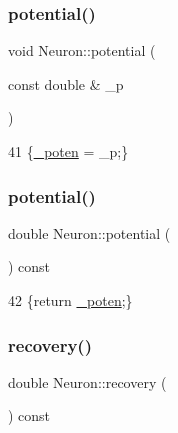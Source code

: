 \subsubsection{\texorpdfstring{potential()}{potential()}\hspace{0.1cm}{\footnotesize\ttfamily [1/2]}}
{\footnotesize\ttfamily void Neuron\+::potential (\begin{DoxyParamCaption}\item[{const double \&}]{\+\_\+p }\end{DoxyParamCaption})\hspace{0.3cm}{\ttfamily [inline]}}


\begin{DoxyCode}
41 \{\hyperlink{classNeuron_a7f7fdc3f9550b870351c60f618c11376}{\_poten} = \_p;\}
\end{DoxyCode}
\mbox{\label{classNeuron_aab6607e17778ff1b4c05610c935b3156}} 
\subsubsection{\texorpdfstring{potential()}{potential()}\hspace{0.1cm}{\footnotesize\ttfamily [2/2]}}
{\footnotesize\ttfamily double Neuron\+::potential (\begin{DoxyParamCaption}{ }\end{DoxyParamCaption}) const\hspace{0.3cm}{\ttfamily [inline]}}


\begin{DoxyCode}
42 \{\textcolor{keywordflow}{return} \hyperlink{classNeuron_a7f7fdc3f9550b870351c60f618c11376}{\_poten};\}
\end{DoxyCode}
\mbox{\label{classNeuron_a2e84bc427827092295070dec404886f4}} 
\subsubsection{\texorpdfstring{recovery()}{recovery()}}
{\footnotesize\ttfamily double Neuron\+::recovery (\begin{DoxyParamCaption}{ }\end{DoxyParamCaption}) const\hspace{0.3cm}{\ttfamily [inline]}}


